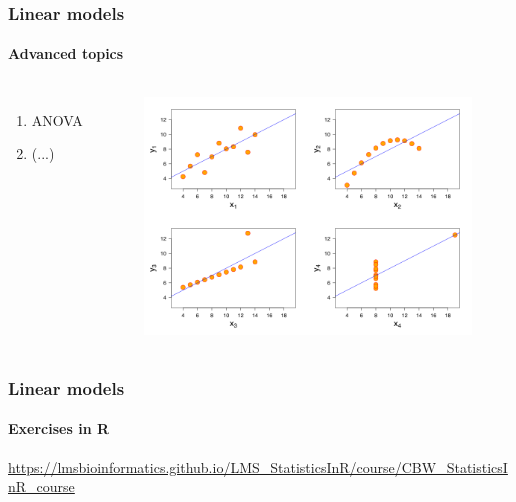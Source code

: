 \documentclass[aspectratio=43]{beamer}
\begin{document}
\begin{frame}
	
	\frametitle{Linear models}
	\framesubtitle{Advanced topics}
	
	\footnotesize
	
	\begin{columns}
		
		
		\begin{enumerate}
			\item ANOVA
			\item (...)
		\end{enumerate}
		
		
		\begin{figure}[!htb]
			\includegraphics[width = \linewidth]{plots/part2/linear_model.png}
		\end{figure}
		
	\end{columns}

\end{frame}

\begin{frame}
	
	\frametitle{Linear models}
	\framesubtitle{Exercises in R}
	
	\footnotesize

	\href{https://lmsbioinformatics.github.io/LMS_StatisticsInR/course/CBW_StatisticsInR_course.html}{https://lmsbioinformatics.github.io/LMS\_StatisticsInR/course/CBW\_StatisticsInR\_course}


\end{frame}
\end{document}

